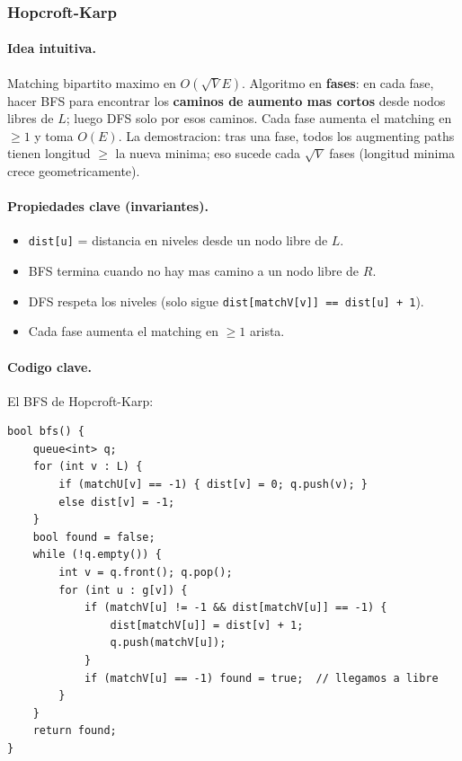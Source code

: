 ﻿\subsubsection{Hopcroft-Karp}

\paragraph{Idea intuitiva.}
Matching bipartito maximo en $O(\sqrt{V} E)$. Algoritmo en \textbf{fases}: en cada fase, hacer BFS para encontrar los \textbf{caminos de aumento mas cortos} desde nodos libres de $L$; luego DFS solo por esos caminos. Cada fase aumenta el matching en $\ge 1$ y toma $O(E)$. La demostracion: tras una fase, todos los augmenting paths tienen longitud $\ge$ la nueva minima; eso sucede cada $\sqrt{V}$ fases (longitud minima crece geometricamente).

\paragraph{Propiedades clave (invariantes).}
\begin{itemize}\setlength\itemsep{0pt}
	\item \texttt{dist[u]} = distancia en niveles desde un nodo libre de $L$.
	\item BFS termina cuando no hay mas camino a un nodo libre de $R$.
	\item DFS respeta los niveles (solo sigue \texttt{dist[matchV[v]] == dist[u] + 1}).
	\item Cada fase aumenta el matching en $\ge 1$ arista.
\end{itemize}

\paragraph{Codigo clave.}
El BFS de Hopcroft-Karp:
\begin{verbatim}
bool bfs() {
    queue<int> q;
    for (int v : L) {
        if (matchU[v] == -1) { dist[v] = 0; q.push(v); }
        else dist[v] = -1;
    }
    bool found = false;
    while (!q.empty()) {
        int v = q.front(); q.pop();
        for (int u : g[v]) {
            if (matchV[u] != -1 && dist[matchV[u]] == -1) {
                dist[matchV[u]] = dist[v] + 1;
                q.push(matchV[u]);
            }
            if (matchV[u] == -1) found = true;  // llegamos a libre
        }
    }
    return found;
}
\end{verbatim}

